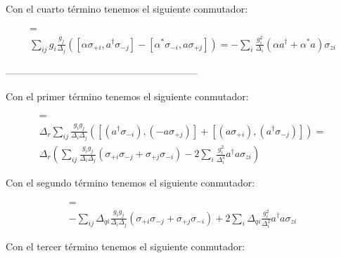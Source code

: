 Con el cuarto término tenemos el siguiente conmutador:

\begin{multline}
[\sum\limits_i g_i (\alpha \sigma_{+i} + \alpha^* \sigma_{-i}), \sum\limits_i \frac{g_i} {\Delta_i} (a^\dagger \sigma_{-i} - a \sigma_{+i})] =\\
\sum\limits_{ij} g_i \frac{g_j} {\Delta_j} \left([\alpha \sigma_{+i}, a^\dagger \sigma_{-j}] - [\alpha^* \sigma_{-i}, a \sigma_{+j}]\right) =
- \sum\limits_i \frac{g_i^2} {\Delta_i} (\alpha a^\dagger + \alpha^* a) \sigma_{zi}
\end{multline}

-----------------------------------------------------------


Con el primer término tenemos el siguiente conmutador:

\begin{multline}
    [\Delta_r \sum\limits_i \frac{g_i} {\Delta_i} (a^\dagger \sigma_{-i} + a \sigma_{+i}), \sum\limits_j \frac{g_j} {\Delta_j} (a^\dagger \sigma_{-j} - a \sigma_{+j})] = \\
    \Delta_r \sum\limits_{ij} \frac{g_i g_j}{\Delta_i \Delta_j} \left([(a^\dagger \sigma_{-i} ), (- a \sigma_{+j})] + 
        [(a \sigma_{+i}), (a^\dagger \sigma_{-j} )]\right) = \\
\Delta_r \left(\sum\limits_{ij} \frac{g_i g_j}{\Delta_i \Delta_j} \left(\sigma_{+i} \sigma_{-j} + \sigma_{+j} \sigma_{-i}\right) -
2 \sum\limits_{i} \frac{g_i^2}{\Delta_i^2} a^\dagger a \sigma_{zi} \right)
\end{multline}

Con el segundo término tenemos el siguiente conmutador:

\begin{multline}
    [- \sum\limits_i \frac{g_i} {\Delta_i} \Delta_{qi} (a^\dagger \sigma_{-i} + a \sigma_{+i}), \sum\limits_j \frac{g_j} {\Delta_j} (a^\dagger \sigma_{-j} - a \sigma_{+j})] = \\
- \sum\limits_{ij} \Delta_{qi}  \frac{g_i g_j}{\Delta_i \Delta_j} \left(\sigma_{+i} \sigma_{-j} + \sigma_{+j} \sigma_{-i}\right) +
2 \sum\limits_{i} \Delta_{qi} \frac{g_i^2}{\Delta_i^2} a^\dagger a \sigma_{zi}
\end{multline}

Con el tercer término tenemos el siguiente conmutador:

